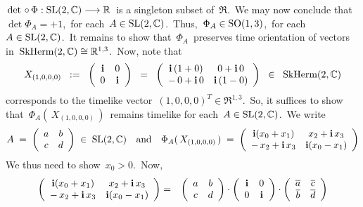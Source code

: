 \begin{enumerate}
	\,$\det \,\circ\, \Phi : \textnormal{SL}(2,\mathbb{C}) \longrightarrow \mathbb{R}$\,
	is a singleton subset of \,$\Re$.\,
	We may now conclude that
	 \,$\det\Phi_{A} = + 1$,\,
	for each \,$A \in \textnormal{SL}(2,\mathbb{C})$.\,
	Thus,
	 \,$\Phi_{A} \in \textnormal{SO}(1,3)$,\,
	for each \,$A \in \textnormal{SL}(2,\mathbb{C})$.\,
	It remains to show that \,$\Phi_{A}$\, preserves time orientation of vectors in \,$\textnormal{SkHerm}(2,\mathbb{C}) \cong \mathbb{R}^{1,3}$.\,
	Now, note that
	\begin{equation*}
	X_{(1,0,0,0)}
	\;\; := \;\;
		\left(\begin{array}{cc} \textnormal{\bf i} & 0 \\ 0 & \textnormal{\bf i} \end{array}\right)
	\;\; = \;\;
		\left(\begin{array}{cc} \textnormal{\bf i}\,(1 + 0) & 0+\textnormal{\bf i}\,0 \\ -\,0+\textnormal{\bf i}\,0 & \textnormal{\bf i}\,(1-0) \end{array}\right)
	\;\; \in \;\;
		\textnormal{SkHerm}(2,\mathbb{C})
	\end{equation*}
	corresponds to the timelike vector
	\,$(1,0,0,0)^{T} \in \Re^{1,3}$.\,
	So, it suffices to show that
	\,$\Phi_{A}(\,X_{(1,0,0,0)}\,)$\,
	remains timelike for each \,$A \in \textnormal{SL}(2,\mathbb{C})$.\,
	We write
	\begin{equation*}
	A
	\; = \;
		\left(\begin{array}{cc} a & b \\ c & d \end{array}\right)
	\; \in \;
		\textnormal{SL}(2,\mathbb{C})
	\quad\textnormal{and}\quad
	\Phi_{A}(\,X_{(1,0,0,0)}\,)
	\; = \;
		\left(\begin{array}{cc} \textnormal{\bf i}(x_{0}+x_{1}) & x_{2}+\textnormal{\bf i}\,x_{3} \\ -\,x_{2}+\textnormal{\bf i}\,x_{3} & \textnormal{\bf i}(x_{0}-x_{1}) \end{array}\right)
	\end{equation*}
	We thus need to show \,$x_{0} > 0$.\,
	Now,
	\begin{eqnarray*}
		\left(\begin{array}{cc} \i(x_{0}+x_{1}) & x_{2}+\i\,x_{3} \\ -\,x_{2}+\i\,x_{3} & \i(x_{0}-x_{1}) \end{array}\right)
	& = &
		\left(\begin{array}{cc} a & b \\ c & d \end{array}\right)
		\cdot
		\left(\begin{array}{cc} \i & 0 \\ 0 & \i \end{array}\right)
		\cdot
		\left(\begin{array}{cc} \overline{a} & \overline{c} \\ \overline{b} & \overline{d} \end{array}\right)

\end{eqnarray*}
\end{enumerate}
